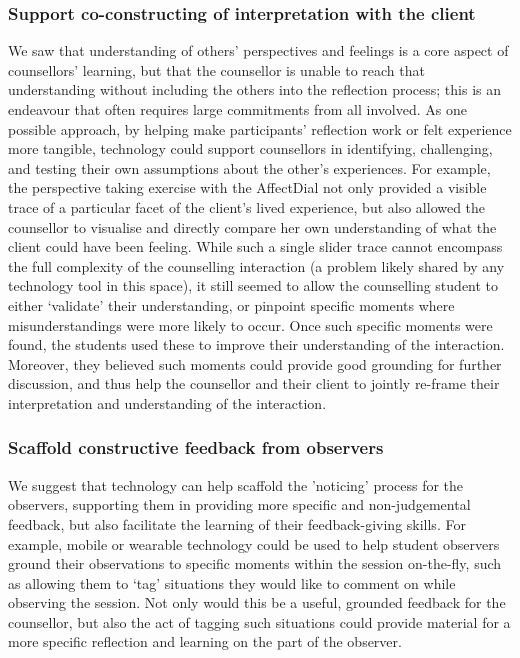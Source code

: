 \documentclass{sigchi}
\begin{document}
\subsubsection{Support co-constructing of interpretation with the client}
We saw that understanding of others' perspectives and feelings is a core aspect of counsellors' learning, but that the counsellor is unable to reach that understanding without including the others into the reflection process; this is an endeavour that often requires large commitments from all involved. As one possible approach, by helping make participants' reflection work or felt experience more tangible, technology could support counsellors in identifying, challenging, and testing their own assumptions about the other's experiences. For example, the perspective taking exercise with the AffectDial not only provided a visible trace of a particular facet of the client's lived experience, but also allowed the counsellor to visualise and directly compare her own understanding of what the client could have been feeling. While such a single slider trace cannot encompass the full complexity of the counselling interaction (a problem likely shared by any technology tool in this space), it still seemed to allow the counselling student to either `validate' their understanding, or pinpoint specific moments where misunderstandings were more likely to occur. Once such specific moments were found, the students used these to improve their understanding of the interaction. Moreover, they  believed such moments could provide good grounding for further discussion, and thus help the counsellor and their client to jointly re-frame their interpretation and understanding of the interaction. 

\subsubsection{Scaffold constructive feedback from observers}
We suggest that technology can help scaffold the 'noticing' process for the observers, supporting them in providing more specific and non-judgemental feedback, but also facilitate the learning of their feedback-giving skills. For example, mobile or wearable technology could be used to help student observers ground their observations to specific moments within the session on-the-fly, such as allowing them to `tag' situations they would like to comment on while observing the session. Not only would this be a useful, grounded feedback for the counsellor, but also the act of tagging such situations could provide material for a more specific reflection and learning on the part of the observer. 
\end{document}
